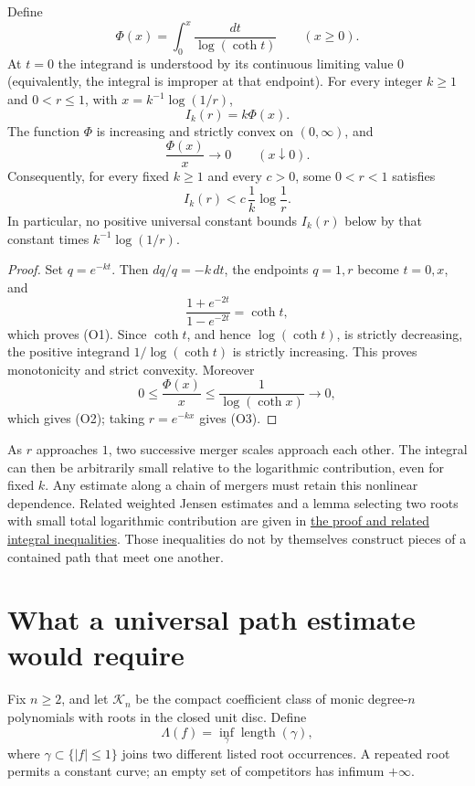 \documentclass[11pt]{article}
\begin{document}
\begin{theorem}
\label{res:orlicz-currency}
Define
\[
 \Phi(x)=\int_0^x\frac{dt}{\log(\coth t)}\qquad(x\ge0).
\]
At $t=0$ the integrand is understood by its continuous limiting value $0$
(equivalently, the integral is improper at that endpoint).
For every integer $k\ge1$ and $0<r\le1$, with
$x=k^{-1}\log(1/r)$,
\[
 I_k(r)=k\Phi(x).                                      \tag{O1}
\]
The function $\Phi$ is increasing and strictly convex on $(0,\infty)$, and
\[
 \frac{\Phi(x)}x\longrightarrow0\qquad(x\downarrow0). \tag{O2}
\]
Consequently, for every fixed $k\ge1$ and every $c>0$, some $0<r<1$
satisfies
\[
 I_k(r)<c\,\frac1k\log\frac1r.                        \tag{O3}
\]
In particular, no positive universal constant bounds $I_k(r)$ below
by that constant times $k^{-1}\log(1/r)$.
\end{theorem}

\begin{proof}
Set $q=e^{-kt}$.  Then $dq/q=-k\,dt$, the endpoints $q=1,r$ become
$t=0,x$, and
\[
 \frac{1+e^{-2t}}{1-e^{-2t}}=\coth t,
\]
which proves (O1).  Since $\coth t$, and hence $\log(\coth t)$, is strictly
decreasing, the positive integrand $1/\log(\coth t)$ is strictly increasing.
This proves monotonicity and strict convexity.  Moreover
\[
 0\le\frac{\Phi(x)}x\le\frac1{\log(\coth x)}\longrightarrow0,
\]
which gives (O2); taking $r=e^{-kx}$ gives (O3).
\end{proof}


As $r$ approaches $1$, two successive merger scales approach each other.
The integral can then be arbitrarily small relative to the logarithmic
contribution, even for
fixed $k$. Any estimate along a chain of mergers must retain this nonlinear
dependence. Related weighted Jensen estimates and a lemma selecting two
roots with small total logarithmic contribution are given in
\href{https://github.com/wcook04/plectis-erdos/blob/f36a98bf3d3e6f65f1074e3b800e3293d5b8a51a/ErdosProblems/Erdos1041/AttachmentAgeLifetimeOrlicz.md}{the proof and related integral inequalities}.
Those inequalities do not by themselves construct pieces of a contained
path that meet one another.

\section{What a universal path estimate would require}\label{sec:open}

Fix $n\ge2$, and let $\mathcal K_n$ be the compact coefficient class of
monic degree-$n$ polynomials with roots in the closed unit disc.  Define
\[
 \Lambda(f)=\inf_\gamma\operatorname{length}(\gamma),
\]
where $\gamma\subset\{|f|\le1\}$ joins two different listed root
occurrences. A repeated root permits a constant curve; an empty set of
competitors has infimum $+\infty$.
\end{document}
